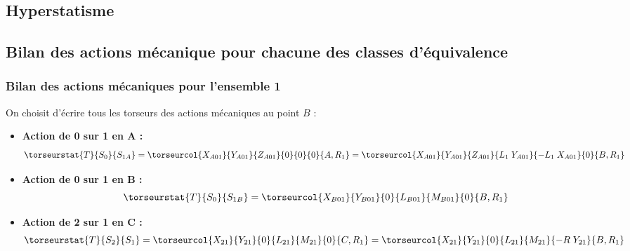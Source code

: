 

\subsection*{Hyperstatisme}






\ifprof



\subsection*{Bilan des actions mécanique pour chacune des classes d'équivalence}
\subsubsection*{Bilan des actions mécaniques pour l'ensemble 1}
On choisit d'écrire tous les torseurs des actions mécaniques au point $B$ :
\begin{itemize}
\item \textbf{Action de 0 sur 1 en A :}
$$
\torseurstat{T}{S_0}{S_{1A}}
=\torseurcol{X_{A01}}{Y_{A01}}{Z_{A01}}{0}{0}{0}{A,R_1}
=\torseurcol{X_{A01}}{Y_{A01}}{Z_{A01}}{L_1\;Y_{A01}}{-L_1\;X_{A01}}{0}{B,R_1}
$$
\item \textbf{Action de 0 sur 1 en B :}
$$
\torseurstat{T}{S_0}{S_{1B}}
=\torseurcol{X_{B01}}{Y_{B01}}{0}{L_{B01}}{M_{B01}}{0}{B,R_1}
$$
\item \textbf{Action de 2 sur 1 en C :}
$$
\torseurstat{T}{S_2}{S_{1}}
=\torseurcol{X_{21}}{Y_{21}}{0}{L_{21}}{M_{21}}{0}{C,R_1}
=\torseurcol{X_{21}}{Y_{21}}{0}{L_{21}}{M_{21}}{-R\;Y_{21}}{B,R_1}
$$

\end{itemize}

